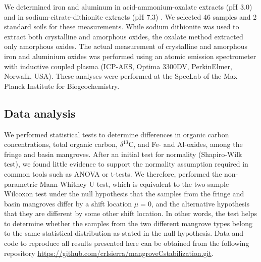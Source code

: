 We determined iron and aluminum in acid-ammonium-oxalate extracts (pH 3.0) and in sodium-citrate-dithionite extracts (pH 7.3) \citep{Schwertmann, Holmgren1967}. We selected 46 samples and 2 standard soils for these measurements. While sodium dithionite was used to extract both crystalline and amorphous oxides, the oxalate method extracted only amorphous oxides. The actual measurement of crystalline and amorphous iron and aluminium oxides was performed using an atomic emission spectrometer with inductive coupled plasma (ICP-AES, Optima 3300DV, PerkinElmer, Norwalk, USA). These analyses were performed at the SpecLab of the Max Planck Institute for Biogeochemistry. 

\subsection{Data analysis}
We performed statistical tests to determine differences in organic carbon concentrations, total organic carbon, $\delta^{13}$C, and Fe- and Al-oxides, among the fringe and basin mangroves. After an initial test for normality (Shapiro-Wilk test), we found little evidence to support the normality assumption required in common tools such as ANOVA or t-tests. We therefore, performed the non-parametric Mann-Whitney U test, which is equivalent to the two-sample Wilcoxon test \citep{Hollander2015} under the null hypothesis that the samples from the fringe and basin mangroves  differ by a shift location $\mu =0$, and the alternative hypothesis that they are different by some other shift location. In other words, the test helps to determine whether the samples from the two different mangrove types belong to the same statistical distribution as stated in the null hypothesis. Data and code to reproduce all results presented here can be obtained from the following repository \url{https://github.com/crlsierra/mangroveCstabilization.git}. 


